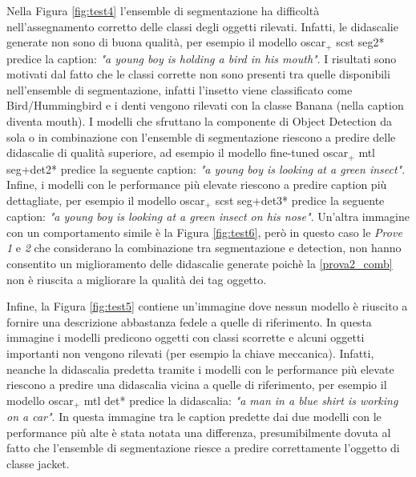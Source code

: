 Nella Figura \ref{fig:test4} l'ensemble di segmentazione ha difficoltà nell'assegnamento corretto delle classi degli oggetti rilevati. Infatti, le didascalie generate non sono di buona qualità, per esempio il modello \acrshort{oscar}$_+$ \acrshort{scst} seg2* predice la caption: \textit{"a young boy is holding a bird in his mouth"}. I risultati sono motivati dal fatto che le classi corrette non sono presenti tra quelle disponibili nell'ensemble di segmentazione, infatti l'insetto viene classificato come Bird/Hummingbird e i denti vengono rilevati con la classe Banana (nella caption diventa mouth). I modelli che sfruttano la componente di Object Detection da sola o in combinazione con l'ensemble di segmentazione riescono a predire delle didascalie di qualità superiore, ad esempio il modello fine-tuned \acrshort{oscar}$_+$ \acrshort{mtl} seg+det2* predice la seguente caption: \textit{"a young boy is looking at a green insect"}. Infine, i modelli con le performance più elevate riescono a predire caption più dettagliate, per esempio il modello \acrshort{oscar}$_+$ \acrshort{scst} seg+det3* predice la seguente caption: \textit{"a young boy is looking at a green insect on his nose"}. Un'altra immagine con un comportamento simile è la Figura \ref{fig:test6}, però in questo caso le \textit{Prove 1} e \textit{2} che considerano la combinazione tra segmentazione e detection, non hanno consentito un miglioramento delle didascalie generate poichè la \ref{prova2_comb} non è riuscita a migliorare la qualità dei tag oggetto.


Infine, la Figura \ref{fig:test5} contiene un'immagine dove nessun modello è riuscito a fornire una descrizione abbastanza fedele a quelle di riferimento. In questa immagine i modelli predicono oggetti con classi scorrette e alcuni oggetti importanti non vengono rilevati (per esempio la chiave meccanica). Infatti, neanche la didascalia predetta tramite i modelli con le performance più elevate riescono a predire una didascalia vicina a quelle di riferimento, per esempio il modello \acrshort{oscar}$_+$ \acrshort{mtl} det* predice la didascalia: \textit{"a man in a blue shirt is working on a car"}. In questa immagine tra le caption predette dai due modelli con le performance più alte è stata notata una differenza, presumibilmente dovuta al fatto che l'ensemble di segmentazione riesce a predire correttamente l'oggetto di classe jacket.

\newpage

